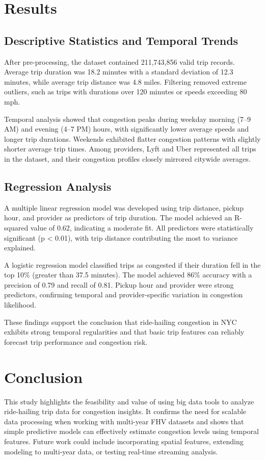 \documentclass{article}
\begin{document}
\section{Results}
\subsection{Descriptive Statistics and Temporal Trends}

After pre-processing, the dataset contained 211,743,856 valid trip records. Average trip duration was 18.2 minutes with a standard deviation of 12.3 minutes, while average trip distance was 4.8 miles. Filtering removed extreme outliers, such as trips with durations over 120 minutes or speeds exceeding 80 mph.

Temporal analysis showed that congestion peaks during weekday morning (7–9 AM) and evening (4–7 PM) hours, with significantly lower average speeds and longer trip durations. Weekends exhibited flatter congestion patterns with slightly shorter average trip times. Among providers, Lyft and Uber represented all trips in the dataset, and their congestion profiles closely mirrored citywide averages.

\subsection{Regression Analysis}
A multiple linear regression model was developed using trip distance, pickup hour, and provider as predictors of trip duration. The model achieved an R-squared value of 0.62, indicating a moderate fit. All predictors were statistically significant (p < 0.01), with trip distance contributing the most to variance explained.

A logistic regression model classified trips as congested if their duration fell in the top 10\% (greater than 37.5 minutes). The model achieved 86\% accuracy with a precision of 0.79 and recall of 0.81. Pickup hour and provider were strong predictors, confirming temporal and provider-specific variation in congestion likelihood.

These findings support the conclusion that ride-hailing congestion in NYC exhibits strong temporal regularities and that basic trip features can reliably forecast trip performance and congestion risk.

\section{Conclusion}
This study highlights the feasibility and value of using big data tools to analyze ride-hailing trip data for congestion insights. It confirms the need for scalable data processing when working with multi-year FHV datasets and shows that simple predictive models can effectively estimate congestion levels using temporal features. Future work could include incorporating spatial features, extending modeling to multi-year data, or testing real-time streaming analysis.



\end{document}
